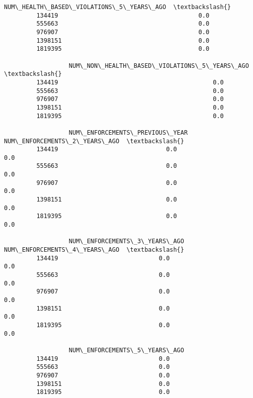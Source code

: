 \documentclass[11pt]{article}
\begin{document}
\begin{Verbatim}[commandchars=\\\{\}]
                  NUM\_HEALTH\_BASED\_VIOLATIONS\_5\_YEARS\_AGO  \textbackslash{}
         134419                                       0.0   
         555663                                       0.0   
         976907                                       0.0   
         1398151                                      0.0   
         1819395                                      0.0   
         
                  NUM\_NON\_HEALTH\_BASED\_VIOLATIONS\_5\_YEARS\_AGO  \textbackslash{}
         134419                                           0.0   
         555663                                           0.0   
         976907                                           0.0   
         1398151                                          0.0   
         1819395                                          0.0   
         
                  NUM\_ENFORCEMENTS\_PREVIOUS\_YEAR  NUM\_ENFORCEMENTS\_2\_YEARS\_AGO  \textbackslash{}
         134419                              0.0                           0.0   
         555663                              0.0                           0.0   
         976907                              0.0                           0.0   
         1398151                             0.0                           0.0   
         1819395                             0.0                           0.0   
         
                  NUM\_ENFORCEMENTS\_3\_YEARS\_AGO  NUM\_ENFORCEMENTS\_4\_YEARS\_AGO  \textbackslash{}
         134419                            0.0                           0.0   
         555663                            0.0                           0.0   
         976907                            0.0                           0.0   
         1398151                           0.0                           0.0   
         1819395                           0.0                           0.0   
         
                  NUM\_ENFORCEMENTS\_5\_YEARS\_AGO  
         134419                            0.0  
         555663                            0.0  
         976907                            0.0  
         1398151                           0.0  
         1819395                           0.0  
\end{Verbatim}
            

    
    
    
    
\end{document}
